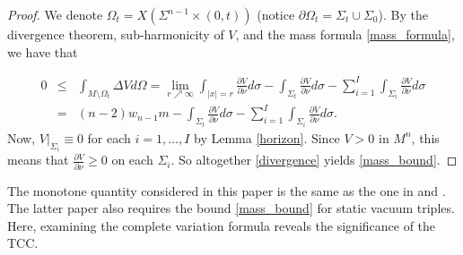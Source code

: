 \documentclass[12pt]{amsart}
\theoremstyle{definition}
\numberwithin{equation}{section}
\begin{document}
\begin{proof}
We denote $\Omega_{t}= X\left( \Sigma^{n-1} \times (0,t) \right)$ (notice $\partial \Omega_{t} =\Sigma_{t} \cup \Sigma_{0}$). By the divergence theorem, sub-harmonicity of $V$, and the mass formula \eqref{mass_formula}, we have that

\begin{eqnarray}
    0 &\leq& \int_{M \setminus \Omega_{t}} \Delta V d\Omega = \lim_{r \nearrow \infty} \int_{|x| = r} \frac{\partial V}{\partial \nu} d\sigma - \int_{\Sigma_{t}} \frac{\partial V}{\partial \nu} d\sigma - \sum_{i=1}^{I} \int_{\Sigma_{i}} \frac{\partial V}{\partial \nu} d\sigma \label{divergence} \\
    &=& (n-2)w_{n-1} m - \int_{\Sigma_{t}} \frac{\partial V}{\partial \nu} d\sigma - \sum_{i=1}^{I} \int_{\Sigma_{i}} \frac{\partial V}{\partial \nu} d\sigma. \nonumber
\end{eqnarray}
Now, $V|_{\Sigma_{i}} \equiv 0$ for each $i = 1, \dots, I$ by Lemma \ref{horizon}. Since $V > 0$ in $M^{n}$, this means that $\frac{\partial V}{\partial \nu} \geq 0$ on each $\Sigma_{i}$. So altogether \eqref{divergence} yields \eqref{mass_bound}.
\end{proof}
The monotone quantity considered in this paper is the same as the one in \cite{W18} and \cite{M18}. The latter paper also requires the bound \eqref{mass_bound} for static vacuum triples. Here, examining the complete variation formula reveals the significance of the TCC.
\end{document}
